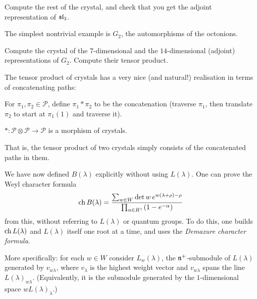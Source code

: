\begin{exercise}
Compute the rest of the crystal, and check that you get the adjoint
representation of $\sl_3$.
\end{exercise}

The simplest nontrivial example is $G_2$, the automorphisms of the octonions.

\begin{exercise}
Compute the crystal of the $7$-dimensional and the $14$-dimensional (adjoint)
representations of $G_2$. Compute their tensor product.
\end{exercise}

The tensor product of crystals has a very nice (and natural!) realisation in
terms of concatenating paths:

\begin{definition}
For $\pi_1, \pi_2 \in \mathcal{P}$, define $\pi_1 * \pi_2$ to be the
concatenation (traverse $\pi_1$, then translate $\pi_2$ to start at
$\pi_1(1)$ and traverse it).
\end{definition}

\begin{exercise}
$*\colon \mathcal{P} \otimes \mathcal{P} \to \mathcal{P}$ is a morphism of
crystals.
\end{exercise}

That is, the tensor product of two crystals simply consists of the
concatenated paths in them.

\begin{remark}
We have now defined $B(\lambda)$ explicitly without using $L(\lambda)$. One
can prove the Weyl character formula
\[
  \ch B(\lambda) = \frac{\sum_{w \in W} \det w \, e^{w(\lambda+\rho) - \rho}}{\prod_{\alpha \in R^+} (1 - e^{-\alpha})}
\]
from this, without referring to $L(\lambda)$ or quantum groups. To do this, one
builds $\ch L(\lambda)$ and $L(\lambda)$ itself one root at a time, and uses
the \emph{Demazure character formula}.

More specifically: for each $w \in W$ consider $L_w(\lambda)$, the
$\fn^+$-submodule of $L(\lambda)$ generated by $v_{w\lambda}$, where $v_\lambda$
is the highest weight vector and $v_{w\lambda}$ spans the line
$L(\lambda)_{w\lambda}$. (Equivalently, it is the submodule generated by the
$1$-dimensional space $wL(\lambda)_\lambda$.)
\end{remark}


